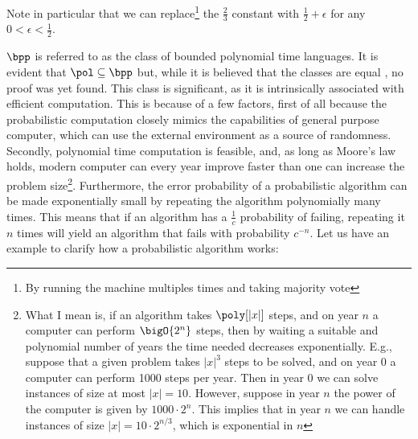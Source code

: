 \documentclass{article}
\begin{document}
Note in particular that we can replace\footnote{By running the machine multiples times and taking majority vote} the $\frac{2}{3}$ constant with $\frac{1}{2} + \epsilon$ for any $0 < \epsilon < \frac{1}{2}$.

$\bpp$ is referred to as the class of bounded polynomial time languages. It is evident that $\pol \subseteq \bpp$ but, while it is believed that the classes are equal \cite{goldreichWorldBPP2011}, no proof was yet found. This class is significant, as it is intrinsically associated with efficient computation. This is because of a few factors, first of all because the probabilistic computation closely mimics the capabilities of general purpose computer, which can use the external environment as a source of randomness. Secondly, polynomial time computation is feasible, and, as long as Moore's law holds, modern computer can every year improve faster than one can increase the problem size\footnote{What I mean is, if an algorithm takes $\poly[|x|]$ steps, and on year $n$ a computer can perform $\bigO{2^n}$ steps, then by waiting a suitable and polynomial number of years the time needed
    decreases exponentially. E.g., suppose that a given problem takes $|x|^3$ steps to be solved, and on year 0 a computer can
    perform 1000 steps per year. Then in year 0 we can solve instances of size at most $|x| = 10$. However, suppose in year $n$ the
    power of the computer is given by $1000 \cdot 2^n$. This implies that in year $n$ we can handle instances of size $|x| = 10 \cdot 2^{n/3} $, which is exponential in $n$}.
Furthermore, the error probability of a probabilistic algorithm can be made exponentially small by repeating the algorithm polynomially many times.
This means that if an algorithm has a $\frac{1}{c}$ probability of failing, repeating it $n$ times will yield an algorithm that fails with probability $c^{-n}$.
Let us have an example to clarify how a probabilistic algorithm works:
\end{document}
